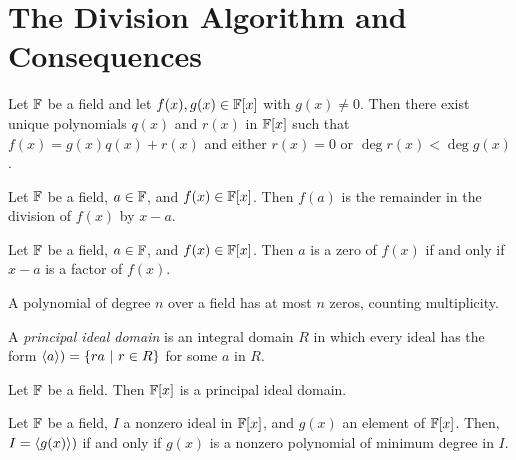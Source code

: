\section{The Division Algorithm and Consequences}

\begin{theorem}
	Let $\mathbb{F}$ be a field and let $f(x), g(x) \in \mathbb{F}[x]$ with $g(x) \neq 0$. Then there exist unique polynomials $q(x)$ and $r(x)$ in $\mathbb{F}[x]$ such that $f(x) = g(x)q(x) + r(x)$ and either $r(x) = 0$ or $\deg r(x) < \deg g(x)$.
\end{theorem}

\begin{corollary}
	Let $\mathbb{F}$ be a field, $a \in \mathbb{F}$, and $f(x) \in \mathbb{F}[x]$. Then $f(a)$ is the remainder in the division of $f(x)$ by $x -a$.
\end{corollary}

\begin{corollary}
	Let $\mathbb{F}$ be a field, $a \in \mathbb{F}$, and $f(x) \in \mathbb{F}[x]$. Then $a$ is a zero of $f(x)$ if and only if $x-a$ is a factor of $f(x)$.
\end{corollary}

\begin{corollary}
	A polynomial of degree $n$ over a field has at most $n$ zeros, counting multiplicity.
\end{corollary}

\begin{definition}
	A \textit{principal ideal domain} is an integral domain $R$ in which every ideal has the form $\langle a \rangle)=\{ra\ \vert\ r \in R\}$ for some $a$ in $R$.
\end{definition}

\begin{theorem}
	Let $\mathbb{F}$ be a field. Then $\mathbb{F}[x]$ is a principal ideal domain.
\end{theorem}

\begin{theorem}[Criterion for $\mathbf{I = \lr{g(x)}}$]
	Let $\mathbb{F}$ be a field, $I$ a nonzero ideal in $\mathbb{F}[x]$, and $g(x)$ an element of $\mathbb{F}[x]$. Then, $I=\langle g(x) \rangle)$ if and only if $g(x)$ is a nonzero polynomial of minimum degree in $I$.
\end{theorem}
